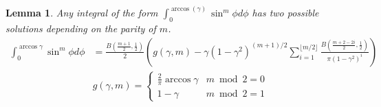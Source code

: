 \documentclass{article}
\newtheorem{lemma}{Lemma}
\begin{document}
\begin{lemma} \label{prop:sin integral}
	Any integral of the form $\int_0^{\arccos(\gamma)} \sin^m \phi d\phi$ has two possible solutions depending on the parity of $m$.
	\begin{align}
		\int_0^{\arccos{\gamma}}\sin^m\phi d\phi&= \frac{B(\frac{m+1}{2}, \frac{1}{2})}{2}\left(g(\gamma, m) - \gamma(1-\gamma^2)^{(m+1)/2} \sum_{i=1}^{\lfloor m/2 \rfloor}\frac{B(\frac{m+2-2i}{2}, \frac{1}{2})}{\pi(1-\gamma^2)^i}\right) \\
		& g(\gamma, m)=\begin{cases}
			\frac{2}{\pi}\arccos \gamma & m \bmod 2=0 \\
			1 - \gamma & m \bmod 2=1
		\end{cases}
	\end{align}
\end{lemma}
\end{document}
